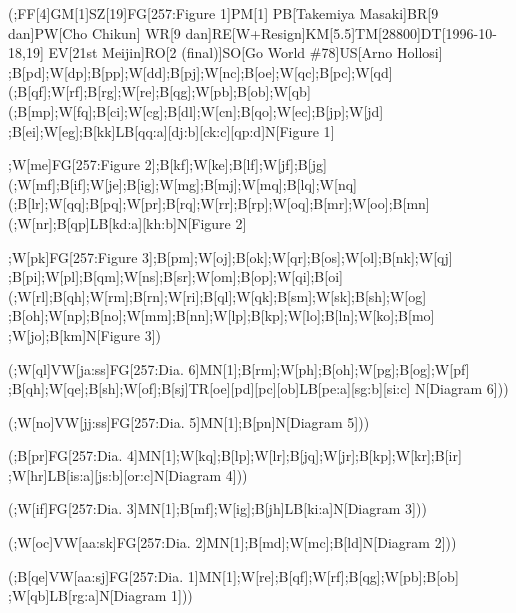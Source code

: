 \newpage

(;FF{[}4{]}GM{[}1{]}SZ{[}19{]}FG{[}257:Figure 1{]}PM{[}1{]}
PB{[}Takemiya Masaki{]}BR{[}9 dan{]}PW{[}Cho Chikun{]} WR{[}9
dan{]}RE{[}W+Resign{]}KM{[}5.5{]}TM{[}28800{]}DT{[}1996-10-18,19{]}
EV{[}21st Meijin{]}RO{[}2 (final){]}SO{[}Go World \#78{]}US{[}Arno
Hollosi{]}
;B{[}pd{]};W{[}dp{]};B{[}pp{]};W{[}dd{]};B{[}pj{]};W{[}nc{]};B{[}oe{]};W{[}qc{]};B{[}pc{]};W{[}qd{]}
(;B{[}qf{]};W{[}rf{]};B{[}rg{]};W{[}re{]};B{[}qg{]};W{[}pb{]};B{[}ob{]};W{[}qb{]}
(;B{[}mp{]};W{[}fq{]};B{[}ci{]};W{[}cg{]};B{[}dl{]};W{[}cn{]};B{[}qo{]};W{[}ec{]};B{[}jp{]};W{[}jd{]}
;B{[}ei{]};W{[}eg{]};B{[}kk{]}LB{[}qq:a{]}{[}dj:b{]}{[}ck:c{]}{[}qp:d{]}N{[}Figure
1{]}

;W{[}me{]}FG{[}257:Figure
2{]};B{[}kf{]};W{[}ke{]};B{[}lf{]};W{[}jf{]};B{[}jg{]}
(;W{[}mf{]};B{[}if{]};W{[}je{]};B{[}ig{]};W{[}mg{]};B{[}mj{]};W{[}mq{]};B{[}lq{]};W{[}nq{]}
(;B{[}lr{]};W{[}qq{]};B{[}pq{]};W{[}pr{]};B{[}rq{]};W{[}rr{]};B{[}rp{]};W{[}oq{]};B{[}mr{]};W{[}oo{]};B{[}mn{]}
(;W{[}nr{]};B{[}qp{]}LB{[}kd:a{]}{[}kh:b{]}N{[}Figure 2{]}

;W{[}pk{]}FG{[}257:Figure
3{]};B{[}pm{]};W{[}oj{]};B{[}ok{]};W{[}qr{]};B{[}os{]};W{[}ol{]};B{[}nk{]};W{[}qj{]}
;B{[}pi{]};W{[}pl{]};B{[}qm{]};W{[}ns{]};B{[}sr{]};W{[}om{]};B{[}op{]};W{[}qi{]};B{[}oi{]}
(;W{[}rl{]};B{[}qh{]};W{[}rm{]};B{[}rn{]};W{[}ri{]};B{[}ql{]};W{[}qk{]};B{[}sm{]};W{[}sk{]};B{[}sh{]};W{[}og{]}
;B{[}oh{]};W{[}np{]};B{[}no{]};W{[}mm{]};B{[}nn{]};W{[}lp{]};B{[}kp{]};W{[}lo{]};B{[}ln{]};W{[}ko{]};B{[}mo{]}
;W{[}jo{]};B{[}km{]}N{[}Figure 3{]})

(;W{[}ql{]}VW{[}ja:ss{]}FG{[}257:Dia.
6{]}MN{[}1{]};B{[}rm{]};W{[}ph{]};B{[}oh{]};W{[}pg{]};B{[}og{]};W{[}pf{]}
;B{[}qh{]};W{[}qe{]};B{[}sh{]};W{[}of{]};B{[}sj{]}TR{[}oe{]}{[}pd{]}{[}pc{]}{[}ob{]}LB{[}pe:a{]}{[}sg:b{]}{[}si:c{]}
N{[}Diagram 6{]}))

(;W{[}no{]}VW{[}jj:ss{]}FG{[}257:Dia. 5{]}MN{[}1{]};B{[}pn{]}N{[}Diagram
5{]}))

(;B{[}pr{]}FG{[}257:Dia.
4{]}MN{[}1{]};W{[}kq{]};B{[}lp{]};W{[}lr{]};B{[}jq{]};W{[}jr{]};B{[}kp{]};W{[}kr{]};B{[}ir{]}
;W{[}hr{]}LB{[}is:a{]}{[}js:b{]}{[}or:c{]}N{[}Diagram 4{]}))

(;W{[}if{]}FG{[}257:Dia.
3{]}MN{[}1{]};B{[}mf{]};W{[}ig{]};B{[}jh{]}LB{[}ki:a{]}N{[}Diagram
3{]}))

(;W{[}oc{]}VW{[}aa:sk{]}FG{[}257:Dia.
2{]}MN{[}1{]};B{[}md{]};W{[}mc{]};B{[}ld{]}N{[}Diagram 2{]}))

(;B{[}qe{]}VW{[}aa:sj{]}FG{[}257:Dia.
1{]}MN{[}1{]};W{[}re{]};B{[}qf{]};W{[}rf{]};B{[}qg{]};W{[}pb{]};B{[}ob{]}
;W{[}qb{]}LB{[}rg:a{]}N{[}Diagram 1{]}))

